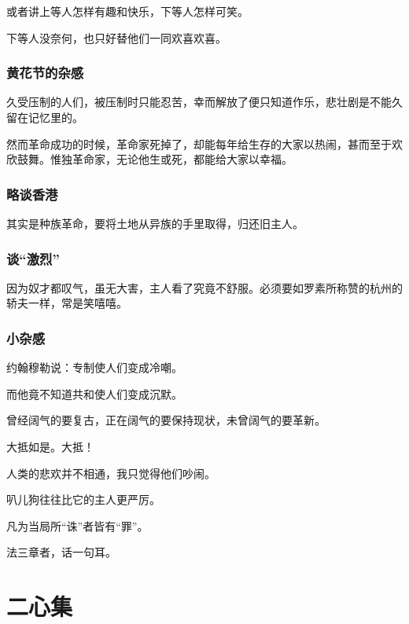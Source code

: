 \documentclass[a4paper]{article}
\begin{document}
\begin{sloppy}
        或者讲上等人怎样有趣和快乐，下等人怎样可笑。
        
        下等人没奈何，也只好替他们一同欢喜欢喜。

        \section{
            黄花节的杂感
        }
        久受压制的人们，被压制时只能忍苦，幸而解放了便只知道作乐，悲壮剧是不能久留在记忆里的。

        然而革命成功的时候，革命家死掉了，却能每年给生存的大家以热闹，甚而至于欢欣鼓舞。惟独革命家，无论他生或死，都能给大家以幸福。

        \section{
            略谈香港
        }
        其实是种族革命，要将土地从异族的手里取得，归还旧主人。

        \section{
            谈“激烈”
        }
        因为奴才都叹气，虽无大害，主人看了究竟不舒服。必须要如罗素所称赞的杭州的轿夫一样，常是笑嘻嘻。

        \section{
            小杂感
        }
        约翰穆勒说：专制使人们变成冷嘲。

        而他竟不知道共和使人们变成沉默。

        \vspace{1em}
        曾经阔气的要复古，正在阔气的要保持现状，未曾阔气的要革新。

        大抵如是。大抵！

        \vspace{1em}
        人类的悲欢并不相通，我只觉得他们吵闹。

        \vspace{1em}
        叭儿狗往往比它的主人更严厉。

        \vspace{1em}
        凡为当局所“诛”者皆有“罪”。

        \vspace{1em}
        法三章者，话一句耳。

        \part{二心集}

\end{sloppy}
\end{document}
